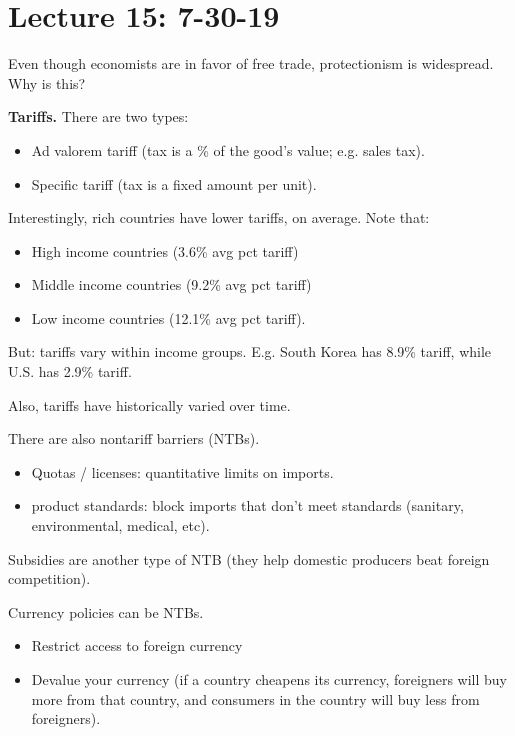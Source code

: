 \documentclass{article}
\begin{document}
\section{Lecture 15: 7-30-19}

Even though economists are in favor of free trade, protectionism is widespread.  Why is this?

{\bf Tariffs.} There are two types:

\begin{itemize}
  \item Ad valorem tariff (tax is a \% of the good's value; e.g. sales tax).
  \item Specific tariff (tax is a fixed amount per unit).
\end{itemize}

Interestingly, rich countries have lower tariffs, on average.  Note that:

\begin{itemize}
  \item High income countries (3.6\% avg pct tariff)
  \item Middle income countries (9.2\% avg pct tariff)
  \item Low income countries (12.1\% avg pct tariff).
\end{itemize}

But: tariffs vary within income groups.  E.g. South Korea has 8.9\% tariff, while U.S. has 2.9\% tariff.

Also, tariffs have historically varied over time.

There are also nontariff barriers (NTBs).

\begin{itemize}
  \item Quotas / licenses: quantitative limits on imports.
  \item product standards: block imports that don't meet standards (sanitary, environmental, medical, etc).
\end{itemize}

Subsidies are another type of NTB (they help domestic producers beat foreign competition).

Currency policies can be NTBs.

\begin{itemize}
  \item Restrict access to foreign currency
  \item Devalue your currency (if a country cheapens its currency, foreigners will buy more from that country, and consumers in the country will buy less from foreigners).
\end{itemize}
\end{document}
